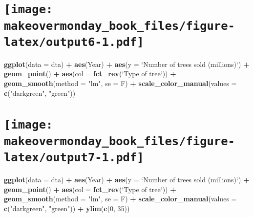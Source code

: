 \documentclass[]{book}
\newenvironment{Shaded}{\begin{snugshade}}{\end{snugshade}}
\newcommand{\KeywordTok}[1]{\textcolor[rgb]{0.13,0.29,0.53}{\textbf{#1}}}
\newcommand{\DataTypeTok}[1]{\textcolor[rgb]{0.13,0.29,0.53}{#1}}
\newcommand{\DecValTok}[1]{\textcolor[rgb]{0.00,0.00,0.81}{#1}}
\newcommand{\StringTok}[1]{\textcolor[rgb]{0.31,0.60,0.02}{#1}}
\newcommand{\OperatorTok}[1]{\textcolor[rgb]{0.81,0.36,0.00}{\textbf{#1}}}
\newcommand{\NormalTok}[1]{#1}
\theoremstyle{definition}
\theoremstyle{definition}
\theoremstyle{definition}
\theoremstyle{remark}
\begin{document}
\section[]{\texorpdfstring{\protect\texttt{[image: makeovermonday\_book\_files/figure-latex/output6-1.pdf]}}{}}\label{section-15}

\clearpage

\begin{Shaded}
\begin{Highlighting}[]
\KeywordTok{ggplot}\NormalTok{(}\DataTypeTok{data =}\NormalTok{ dta) }\OperatorTok{+}
\StringTok{  }\KeywordTok{aes}\NormalTok{(Year) }\OperatorTok{+}
\StringTok{  }\KeywordTok{aes}\NormalTok{(}\DataTypeTok{y =} \StringTok{`}\DataTypeTok{Number of trees sold (millions)}\StringTok{`}\NormalTok{) }\OperatorTok{+}
\StringTok{  }\KeywordTok{geom_point}\NormalTok{() }\OperatorTok{+}
\StringTok{  }\KeywordTok{aes}\NormalTok{(}\DataTypeTok{col =} \KeywordTok{fct_rev}\NormalTok{(}\StringTok{`}\DataTypeTok{Type of tree}\StringTok{`}\NormalTok{)) }\OperatorTok{+}
\StringTok{  }\KeywordTok{geom_smooth}\NormalTok{(}\DataTypeTok{method =} \StringTok{"lm"}\NormalTok{, }\DataTypeTok{se =}\NormalTok{ F) }\OperatorTok{+}
\StringTok{  }\KeywordTok{scale_color_manual}\NormalTok{(}\DataTypeTok{values =} \KeywordTok{c}\NormalTok{(}\StringTok{"darkgreen"}\NormalTok{, }\StringTok{"green"}\NormalTok{)) }
\end{Highlighting}
\end{Shaded}

\section[]{\texorpdfstring{\protect\texttt{[image: makeovermonday\_book\_files/figure-latex/output7-1.pdf]}}{}}\label{section-16}

\clearpage

\begin{Shaded}
\begin{Highlighting}[]
\KeywordTok{ggplot}\NormalTok{(}\DataTypeTok{data =}\NormalTok{ dta) }\OperatorTok{+}
\StringTok{  }\KeywordTok{aes}\NormalTok{(Year) }\OperatorTok{+}
\StringTok{  }\KeywordTok{aes}\NormalTok{(}\DataTypeTok{y =} \StringTok{`}\DataTypeTok{Number of trees sold (millions)}\StringTok{`}\NormalTok{) }\OperatorTok{+}
\StringTok{  }\KeywordTok{geom_point}\NormalTok{() }\OperatorTok{+}
\StringTok{  }\KeywordTok{aes}\NormalTok{(}\DataTypeTok{col =} \KeywordTok{fct_rev}\NormalTok{(}\StringTok{`}\DataTypeTok{Type of tree}\StringTok{`}\NormalTok{)) }\OperatorTok{+}
\StringTok{  }\KeywordTok{geom_smooth}\NormalTok{(}\DataTypeTok{method =} \StringTok{"lm"}\NormalTok{, }\DataTypeTok{se =}\NormalTok{ F) }\OperatorTok{+}
\StringTok{  }\KeywordTok{scale_color_manual}\NormalTok{(}\DataTypeTok{values =} \KeywordTok{c}\NormalTok{(}\StringTok{"darkgreen"}\NormalTok{, }\StringTok{"green"}\NormalTok{)) }\OperatorTok{+}
\StringTok{  }\KeywordTok{ylim}\NormalTok{(}\KeywordTok{c}\NormalTok{(}\DecValTok{0}\NormalTok{, }\DecValTok{35}\NormalTok{)) }
\end{Highlighting}
\end{Shaded}
\end{document}
